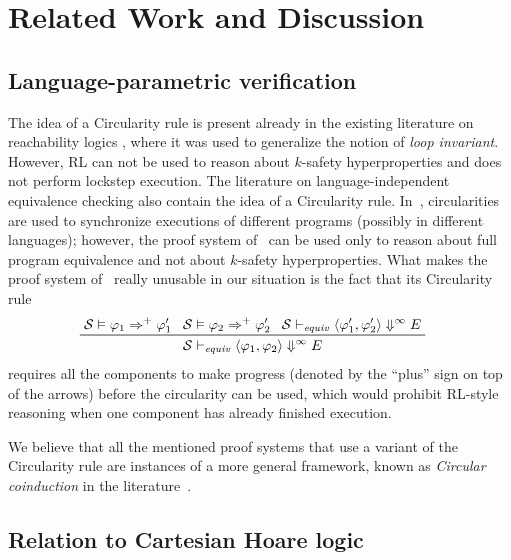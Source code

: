 
\section{Related Work and Discussion}\label{sec:discussion}

\subsection{Language-parametric verification}

The idea of a Circularity rule is present already 
in the existing literature on reachability logics \cite{RosuS12oopsla,RosuSCM13lics,StefanescuCMMSR19},
where it was used to generalize the notion of \emph{loop invariant}.
However, RL can not be used to reason about $k$-safety hyperproperties and does not perform lockstep execution.
The literature on language-independent equivalence checking also contain the idea of a Circularity rule.
In~\cite{CiobacaLRR16}, circularities are used to synchronize executions of different programs (possibly in different languages);
however, the proof system of~\cite{CiobacaLRR16} can be used only to reason about full program equivalence
and not about $k$-safety hyperproperties.
What makes the proof system of~\cite{CiobacaLRR16} really unusable in our situation is the fact that its
Circularity rule
\begin{align*}
  & \prftree[l]{}
    { \mathcal{S} \vDash \varphi_1 \Rightarrow^+ \varphi^\prime_1 }
    { \mathcal{S} \vDash \varphi_2 \Rightarrow^+ \varphi^\prime_2 }
    { \mathcal{S} \vdash_{\mathit{equiv}} \langle \varphi^\prime_1, \varphi^\prime_2 \rangle \Downarrow^{\infty} E}
    { \mathcal{S} \vdash_{\mathit{equiv}} \langle \varphi_1, \varphi_2 \rangle \Downarrow^{\infty} E}
\end{align*}
requires all the components to make progress (denoted by the ``plus'' sign on top of the arrows) before the circularity can be used,
which would prohibit RL-style reasoning when one component has already finished execution.

We believe that all the mentioned proof systems that use a variant of the Circularity rule are instances of a more general
framework, known as \emph{Circular coinduction} in the literature~\cite{RosuL09CircularCoinduction}.



\subsection{Relation to Cartesian Hoare logic}

